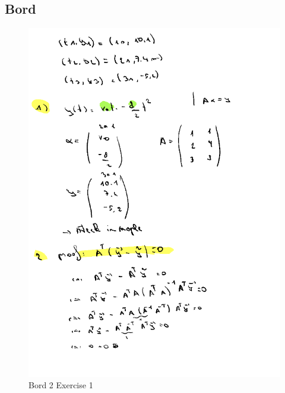 \documentclass[a4paper]{report}
\begin{document}
\subsection{Bord}

\begin{figure}[H]
	\centering
	\includegraphics[width=\textwidth]{assets/bordles_2_ex_1.png}
	\caption{Bord 2 Exercise 1}
	\label{fig:bord_2_ex_1}
\end{figure}


\end{document}
